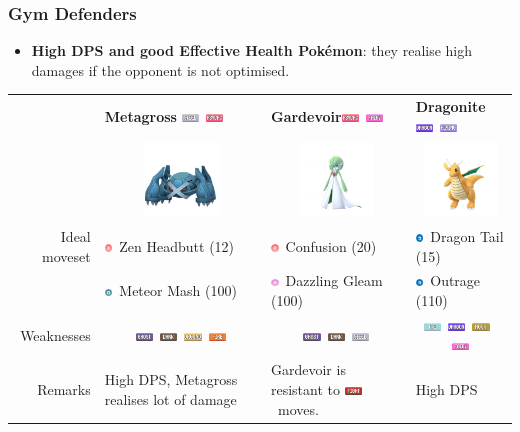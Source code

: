 \documentclass[12pt]{beamer}
\newcommand{\fightingfull}{\includegraphics[height=0.2cm]{../../images/type/full/Fighting.png}}
\newcommand{\darkfull}{\includegraphics[height=0.2cm]{../../images/type/full/Dark.png}}
\newcommand{\fairyfull}{\includegraphics[height=0.2cm]{../../images/type/full/Fairy.png}}
\newcommand{\firefull}{\includegraphics[height=0.2cm]{../../images/type/full/Fire.png}}
\newcommand{\flyingfull}{\includegraphics[height=0.2cm]{../../images/type/full/Flying.png}}
\newcommand{\ghostfull}{\includegraphics[height=0.2cm]{../../images/type/full/Ghost.png}}
\newcommand{\dragonfull}{\includegraphics[height=0.2cm]{../../images/type/full/Dragon.png}}
\newcommand{\groundfull}{\includegraphics[height=0.2cm]{../../images/type/full/Ground.png}}
\newcommand{\icefull}{\includegraphics[height=0.2cm]{../../images/type/full/Ice.png}}
\newcommand{\psychicfull}{\includegraphics[height=0.2cm]{../../images/type/full/Psychic.png}}
\newcommand{\rockfull}{\includegraphics[height=0.2cm]{../../images/type/full/Rock.png}}
\newcommand{\steelfull}{\includegraphics[height=0.2cm]{../../images/type/full/Steel.png}}
\newcommand{\dragonsimp}{\includegraphics[height=0.2cm]{../../images/type/simplified/dragon.png}}
\newcommand{\psysimp}{\includegraphics[height=0.2cm]{../../images/type/simplified/psy.png}}
\newcommand{\steelsimp}{\includegraphics[height=0.2cm]{../../images/type/simplified/steel.png}}
\newcommand{\fairysimp}{\includegraphics[height=0.2cm]{../../images/type/simplified/fairy.png}}
\begin{document}
\begin{frame}
\frametitle{Gym Defenders}

\begin{block}{}
\begin{footnotesize}

\begin{itemize}
  \item \textbf{High DPS and good Effective Health Pok\'emon}: they realise high damages if the opponent is not optimised. 
\end{itemize}

\begin{center}
\begin{tabular}{rp{3.2cm}p{3.2cm}p{3.2cm}}
& \textbf{Metagross} \hfill \steelfull~\psychicfull &  \textbf{Gardevoir}\hfill \psychicfull~\fairyfull & \textbf{Dragonite} \hfill \dragonfull~\flyingfull \\ 
&\multicolumn{1}{c}{\includegraphics[width=2cm]{../../images/pokemon/Metagross}} &
\multicolumn{1}{c}{\includegraphics[width=2cm]{../../images/pokemon/Gardevoir}} &
\multicolumn{1}{c}{\includegraphics[width=2cm]{../../images/pokemon/Dragonite}}   \\ \hline
Ideal moveset &  \psysimp~Zen Headbutt (12) & \psysimp~Confusion (20) &  \dragonsimp~Dragon Tail (15)\\ 
&\steelsimp~Meteor Mash (100) & \fairysimp~Dazzling Gleam (100) & \dragonsimp~Outrage (110)  \\ \hline
Weaknesses & \multicolumn{1}{c}{\ghostfull~\darkfull~\groundfull~\firefull} & \multicolumn{1}{c}{\ghostfull~\darkfull~\steelfull} & \multicolumn{1}{c}{\icefull~\dragonfull~\rockfull~\fairyfull}  \\ \hline
Remarks & High DPS, Metagross realises lot of damage & Gardevoir is resistant to \fightingfull~moves. & High DPS \\ 
\end{tabular}
\end{center}


\end{footnotesize}
\end{block}
\end{frame}
\end{document}

